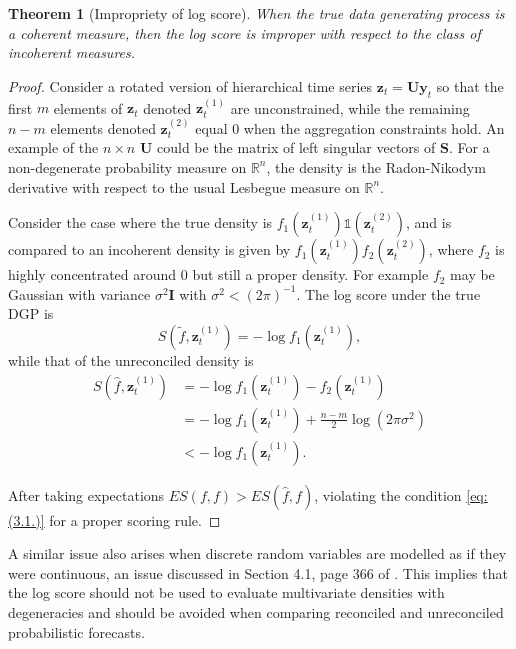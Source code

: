 \documentclass[a4paper, 11pt]{article}
\theoremstyle{theo}
\newtheorem{theo}{Theorem}[section]
\theoremstyle{definition}
\begin{document}
\begin{theo}[Impropriety of log score]
	When the true data generating process is a coherent measure, then the log score is improper with respect to the class of incoherent measures.
\end{theo}
\begin{proof}
Consider a rotated version of hierarchical time series $\bm{z}_t={\bm U}{\bm y}_t$ so that the first $m$ elements of $\bm{z}_t$ denoted $\bm{z}^{(1)}_t$ are unconstrained, while the remaining $n-m$ elements denoted $\bm{z}^{(2)}_t$ equal $0$ when the aggregation constraints hold. An example of the $n\times n$ ${\bm U}$ could be the matrix of left singular vectors of ${\bm S}$.  For a non-degenerate probability measure on $\mathbb{R}^n$, the density is the Radon-Nikodym derivative with respect to the usual Lesbegue measure on $\mathbb{R}^n$.  %

Consider the case where the true density is $f_1(\bm{z}^{(1)}_t)\mathbb{1}\left({\bm{z}^{(2)}_t}\right)$, and is compared to an incoherent density is given by $f_1(\bm{z}^{(1)}_t)f_2(\bm{z}^{(2)}_t)$, where $f_2$ is highly concentrated around $0$ but still a proper density. For example $f_2$ may be Gaussian with variance $\sigma^2{\bm I}$ with $\sigma^2 < (2\pi)^{-1}$. The log score under the true DGP is
$$
S\left(\tilde{f},\bm{z}^{(1)}_t\right) = -\log f_1\left(\bm{z}^{(1)}_t\right),
$$
while that of the unreconciled density is
\begin{align}
S\left(\hat{f},\bm{z}^{(1)}_t\right) &= -\log f_1(\bm{z}^{(1)}_t)-f_2(\bm{z}^{(1)}_t)\\
&= -\log f_1(\bm{z}^{(1)}_t)+\frac{n-m}{2}\log(2\pi\sigma^2)\\
&<-\log f_1(\bm{z}^{(1)}_t).
\end{align}


After taking expectations $ES(f,f) > ES(\hat{f},f)$, violating the condition \eqref{eq:(3.1.)} for a proper scoring rule.  
\end{proof}

A similar issue also arises when discrete random variables are modelled as if they were continuous, an issue discussed in Section 4.1, page 366 of \cite{Gneiting2007}. This implies that the log score should not be used to evaluate multivariate densities with degeneracies and should be avoided when comparing reconciled and unreconciled probabilistic forecasts.
\end{document}
